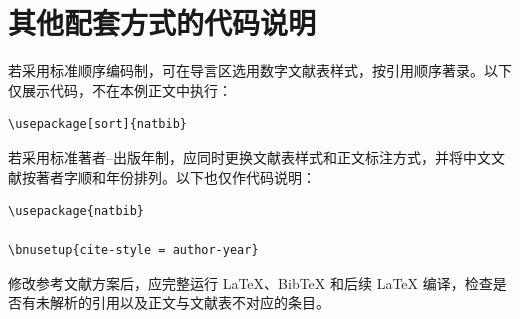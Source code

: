 \section{其他配套方式的代码说明}

若采用标准顺序编码制，可在导言区选用数字文献表样式，按引用顺序著录。以下仅展示代码，不在本例正文中执行：
\begin{verbatim}
\usepackage[sort]{natbib}

\end{verbatim}

若采用标准著者--出版年制，应同时更换文献表样式和正文标注方式，并将中文文献按著者字顺和年份排列。以下也仅作代码说明：
\begin{verbatim}
\usepackage{natbib}

\bnusetup{cite-style = author-year}
\end{verbatim}

修改参考文献方案后，应完整运行 LaTeX、BibTeX 和后续 LaTeX 编译，检查是否有未解析的引用以及正文与文献表不对应的条目。

\cite{zhangkun1994,zhukezhen1973,dupont1974bone,zhengkaiqing1987,%
  jiangxizhou1980,jianduju1994,merkt1995rotational,mellinger1996laser,%
  bixon1996dynamics,mahui1995,carlson1981two,taylor1983scanning,%
  taylor1981study,shimizu1983laser,atkinson1982experimental,%
  kusch1975perturbations,guangxi1993,huosini1989guwu,wangfuzhi1865songlun}

\cite{zhaoyaodong1998xinshidai,biaozhunhua2002tushu,chubanzhuanye2004,%
  who1970factors,peebles2001probability,baishunong1998zhiwu,%
  weinstein1974pathogenic,hanjiren1985lun,dizhi1936dizhi,%
  tushuguan1957tushuguanxue,aaas1883science,fugang2000fengsha,%
  xiaoyu2001chubanye,oclc2000about,scitor2000project%
}
